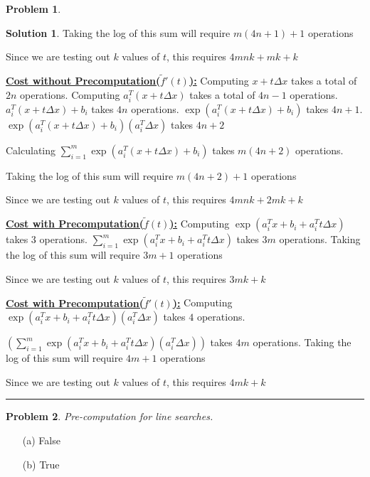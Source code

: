 \documentclass{article}
\theoremstyle{definition}
\newtheorem{problem}{Problem}
\def\fline{\rule{0.75\linewidth}{0.5pt}}
\newcommand{\finishline}{\begin{center}\fline\end{center}}
\newtheorem*{solution*}{Solution}
\newenvironment{solution}{\begin{solution*}}{{\finishline} \end{solution*}}
\begin{document}
\begin{problem}
\begin{enumerate}
\begin{solution}
        Taking the log of this sum will require $m(4n + 1) + 1$ operations
        
        Since we are testing out $k$ values of $t$, this requires $4mnk + mk + k$ \newline 
        
        \textbf{\underline{Cost without Precomputation($\tilde{f}'(t)$):}} \newline 
        Computing $x + t \Delta x$ takes a total of $2n$ operations. Computing $a_i^T(x + t \Delta x)$ takes a total of $4n - 1$ operations. $a_i^T(x + t\Delta x) + b_i$ takes $4n$ operations. $\exp(a_i^T(x + t\Delta x) + b_i)$ takes $4n + 1$. $\exp(a_i^T(x + t\Delta x) + b_i) (a_i^T \Delta x)$ takes $4n + 2$
        
        Calculating $\sum_{i=1}^{m} \exp(a_i^T(x + t\Delta x) + b_i)$ takes $m(4n + 2)$ operations.
                
        Taking the log of this sum will require $m(4n + 2) + 1$ operations
        
        Since we are testing out $k$ values of $t$, this requires $4mnk + 2mk + k$ \newline 
        
        
        \textbf{\underline{Cost with Precomputation($\tilde{f}(t)$):}} \newline 
        Computing $\exp(a_i^Tx + b_i + a_i^T t\Delta x)$ takes $3$ operations. $\sum_{i=1}^{m} \exp(a_i^Tx + b_i + a_i^T t\Delta x)$ takes $3m$ operations. Taking the log of this sum will require $3m + 1$ operations
        
        Since we are testing out $k$ values of $t$, this requires $3mk + k$ \newline 
        
        \textbf{\underline{Cost with Precomputation($\tilde{f}'(t)$):}} \newline 
        Computing $\exp(a_i^Tx + b_i + a_i^T t\Delta x) (a_i^T \Delta x)$ takes $4$ operations.
        
        $(\sum_{i=1}^{m} \exp(a_i^Tx + b_i + a_i^T t\Delta x) (a_i^T \Delta x))$ takes $4m$ operations. Taking the log of this sum will require $4m + 1$ operations
        
        Since we are testing out $k$ values of $t$, this requires $4mk + k$ \newline 
    
    \end{solution}
    
\end{enumerate}

\end{problem}

\begin{problem}
\textit{Pre-computation for line searches.} 

\begin{enumerate}
\item[(a)] False
\item[(b)] True
\end{enumerate}
\end{problem}
\end{document}
